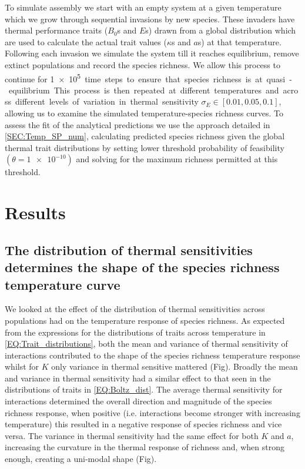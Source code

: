 \documentclass{article}
\begin{document}
To simulate assembly we start with an empty system at a given temperature which we grow through sequential invasions by new species. These invaders have thermal performance traits ($B_0$s and $E$s) drawn from a global distribution which are used to calculate the actual trait values ($\kappa$s and $a$s) at that temperature. Following each invasion we simulate the system till it reaches equilibrium, remove extinct populations and record the species richness. We allow this process to continue for \SI{1e5} time steps to ensure that species richness is at quasi-equilibrium. This process is then repeated at different temperatures and across different levels of variation in thermal sensitivity $\sigma_E \in [0.01, 0.05, 0.1]$, allowing us to examine the simulated temperature-species richness curves. To assess the fit of the analytical predictions we use the approach detailed in \cref{SEC:Temp_SP_num}, calculating predicted species richness given the global thermal trait distributions by setting lower threshold probability of feasibility $(\theta = \SI{1e-10})$ and solving for the maximum richness permitted at this threshold.

\section{Results}

\subsection{The distribution of thermal sensitivities determines the shape of the species richness temperature curve}

We looked at the effect of the distribution of thermal sensitivities across populations had on the temperature response of species richness. As expected from the expressions for the distributions of traits across temperature in \cref{EQ:Trait_distributions}, both the mean and variance of thermal sensitivity of interactions contributed to the shape of the species richness temperature response whilst for $K$ only variance in thermal sensitive mattered (Fig). Broadly the mean and variance in thermal sensitivity had a similar effect to that seen in the distributions of traits in \cref{EQ:Boltz_dist}. The average thermal sensitivity for interactions determined the overall direction and magnitude of the species richness response, when positive (i.e. interactions become stronger with increasing temperature) this resulted in a negative response of species richness and vice versa. The variance in thermal sensitivity had the same effect for both $K$ and $a$, increasing the curvature in the thermal response of richness and, when strong enough, creating a uni-modal shape (Fig). 
\end{document}
